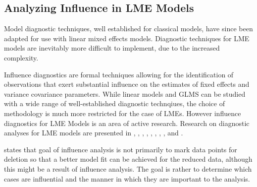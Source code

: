 \documentclass[12pt, a4paper]{report}
\theoremstyle{plain}
\theoremstyle{definition}
\theoremstyle{remark}
\begin{document}
\subsection{Analyzing Influence in LME Models}

Model diagnostic techniques, well established for classical models, have since been adapted for use with linear mixed effects models. Diagnostic techniques for LME models are inevitably more difficult to implement, due to the increased complexity.

Influence diagnostics are formal techniques allowing for the identification of observations that exert substantial  influence on the estimates of fixed effects and variance covariance parameters.
While linear models and GLMS can be studied with a wide range of well-established diagnostic technqiues, the choice of methodology is much more restricted for the case of LMEs. However
	influence diagnostics for LME Models is an area of active research. Research on diagnostic analyses for LME models are presented in \citet{Beckman}, 
	\citet{Christensen}, \citet{HildenMinton}, \citet{lesaffre1998local}, \citet{Banerjee1997}, 
	\citet{fung2002}, \citet{Demi}, \citet{Zewotir}, \citet{zewotir2008} and \citet{NobreSinger2007, NobreSinger2011}.
	
	
	
	
	
	\citet{schabenberger} states that goal of influence analysis is not primarily to mark data
	points for deletion so that a better model fit can be achieved for the reduced data, although this might be a
	result of influence analysis. The goal is rather to determine which cases are influential and the manner in
	which they are important to the analysis. 



%








%
\end{document}
